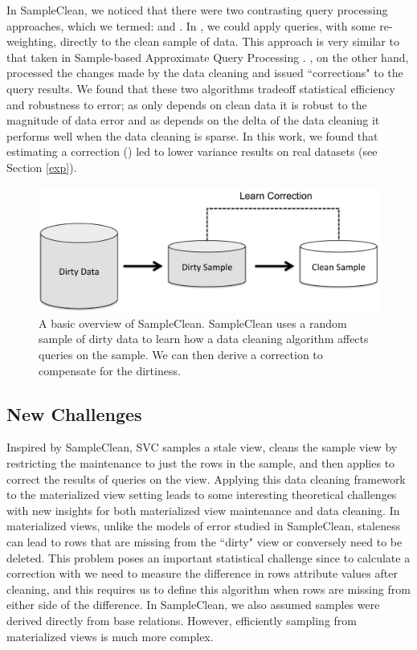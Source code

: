 In SampleClean, we noticed that there were two contrasting query processing approaches, which we termed: \rsc and \nsc.
In \rsc, we could apply queries, with some re-weighting, directly to the clean sample of data.
This approach is very similar to that taken in Sample-based Approximate Query Processing \cite{OlkenR86,AgarwalMPMMS13, joshi2008materialized}.
\nsc, on the other hand, processed the changes made by the data cleaning and issued ``corrections" to the query results.
We found that these two algorithms tradeoff statistical efficiency and robustness to error; as \rsc only depends on clean data it is robust to the magnitude of data error and as \nsc depends on the delta of the data cleaning it performs well when the data cleaning is sparse. 
In this work, we found that estimating a correction (\nsc) led to lower variance results on real datasets (see Section \ref{exp}). 

\begin{figure}[t] \vspace{-2em}
\centering
 \includegraphics[scale=0.30]{figs/sys-arch2.pdf} \vspace{-.25em}
 \caption{A basic overview of SampleClean. SampleClean uses a random sample of dirty data to learn how a data cleaning algorithm affects queries on the sample. We can then derive a correction to compensate for the dirtiness.\label{sc}}\vspace{-1.75em}
\end{figure}

\subsection{New Challenges}
Inspired by SampleClean, SVC samples a stale view, cleans the sample view by restricting the maintenance to just the rows in the sample, and then applies \nsc to correct the results of queries on the view.
Applying this data cleaning framework to the materialized view setting leads to some interesting theoretical challenges with new insights for both materialized view maintenance and data cleaning.
In materialized views, unlike the models of error studied in SampleClean, staleness can lead to rows that are missing from the ``dirty" view or conversely need to be deleted.
This problem poses an important statistical challenge since to calculate a correction with \nsc we need to measure the difference in rows attribute values after cleaning, and this requires us to define this algorithm when rows are missing from either side of the difference.
In SampleClean, we also assumed samples were derived directly from base relations.
However, efficiently sampling from materialized views is much more complex.

